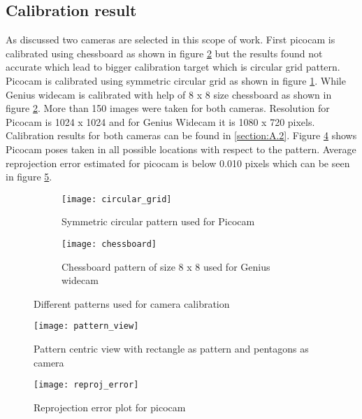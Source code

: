 \subsection{Calibration result}
As discussed two cameras are selected in this scope of work. First picocam is calibrated using chessboard as shown in figure \ref{fig:chessboard} but the results found not accurate which lead to bigger calibration target which is circular grid pattern. Picocam is calibrated using symmetric circular grid as shown in figure \ref{fig:circular_grid}. While Genius widecam is calibrated with help of 8 x 8 size chessboard as shown in figure \ref{fig:chessboard}. More than 150 images were taken for both cameras. Resolution for Picocam is 1024 x 1024 and for Genius Widecam it is 1080 x 720 pixels. Calibration results for both cameras can be found in \ref{section:A.2}. Figure \ref{fig:pattern_view} shows Picocam poses taken in all possible locations with respect to the pattern. Average reprojection error estimated for picocam is below 0.010 pixels which can be seen in figure \ref{fig:reproj}.\\
\begin{figure}[h!]
	\begin{subfigure}{0.5\textwidth}
		\centering
		\texttt{[image: circular\_grid]}
		\caption{Symmetric circular pattern used for Picocam}
		\label{fig:circular_grid}
	\end{subfigure}%
	\begin{subfigure}{0.5\textwidth}
		\centering
		\texttt{[image: chessboard]}
		\caption{Chessboard pattern of size 8 x 8 used for Genius widecam}
		\label{fig:chessboard}
	\end{subfigure}
	\caption{Different patterns used for camera calibration}
	\label{fig:patterns}
\end{figure}
\begin{figure}[h!]
	\centering
	\texttt{[image: pattern\_view]}
	\caption{Pattern centric view with rectangle as pattern and pentagons as camera}
	\label{fig:pattern_view}
\end{figure}
\begin{figure}[h!]
	\centering
	\texttt{[image: reproj\_error]}
	\caption{Reprojection error plot for picocam}
	\label{fig:reproj}
\end{figure}